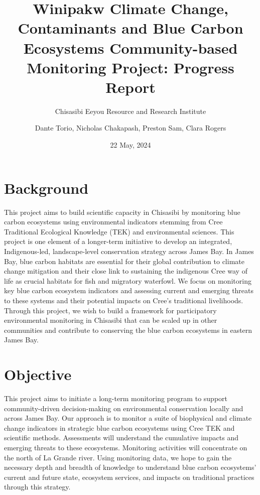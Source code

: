 \documentclass[
  12pt,
]{article}
\title{Winipakw Climate Change, Contaminants and Blue Carbon Ecosystems
Community-based Monitoring Project: Progress Report}
\subtitle{Chisasibi Eeyou Resource and Research Institute}
\author{Dante Torio, Nicholas Chakapash, Preston Sam, Clara Rogers}
\date{22 May, 2024}
\begin{document}
\maketitle

{
\setcounter{tocdepth}{2}
\tableofcontents
}
\newpage

\hypertarget{background}{%
\section{Background}\label{background}}

This project aims to build scientific capacity in Chisasibi by
monitoring blue carbon ecosystems using environmental indicators
stemming from Cree Traditional Ecological Knowledge (TEK) and
environmental sciences. This project is one element of a longer-term
initiative to develop an integrated, Indigenous-led, landscape-level
conservation strategy across James Bay. In James Bay, blue carbon
habitats are essential for their global contribution to climate change
mitigation and their close link to sustaining the indigenous Cree way of
life as crucial habitats for fish and migratory waterfowl. We focus on
monitoring key blue carbon ecosystem indicators and assessing current
and emerging threats to these systems and their potential impacts on
Cree's traditional livelihoods. Through this project, we wish to build a
framework for participatory environmental monitoring in Chisasibi that
can be scaled up in other communities and contribute to conserving the
blue carbon ecosystems in eastern James Bay.

\hypertarget{objective}{%
\section{Objective}\label{objective}}

This project aims to initiate a long-term monitoring program to support
community-driven decision-making on environmental conservation locally
and across James Bay. Our approach is to monitor a suite of biophysical
and climate change indicators in strategic blue carbon ecosystems using
Cree TEK and scientific methods. Assessments will understand the
cumulative impacts and emerging threats to these ecosystems. Monitoring
activities will concentrate on the north of La Grande river. Using
monitoring data, we hope to gain the necessary depth and breadth of
knowledge to understand blue carbon ecosystems' current and future
state, ecosystem services, and impacts on traditional practices through
this strategy.
\end{document}
